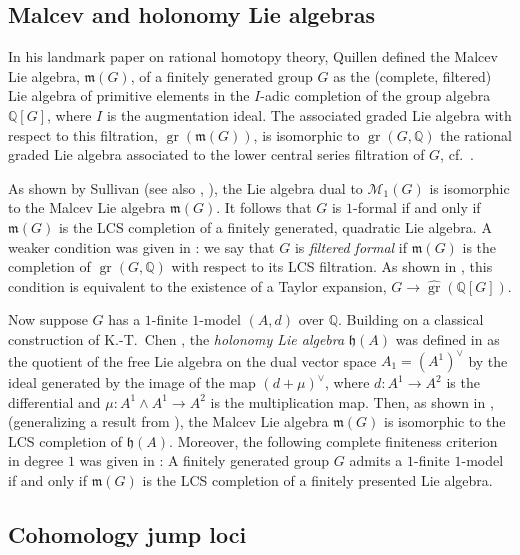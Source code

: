 \documentclass{article}
\numberwithin{equation}{section}
\theoremstyle{definition}
\newcommand{\Q}{\mathbb{Q}}
\newcommand{\M}{\mathcal{M}}
\newcommand{\h}{{\mathfrak{h}}}
\newcommand{\m}{{\mathfrak{m}}}
\DeclareMathOperator{\gr}{gr}
\begin{document}
\subsection{Malcev and holonomy Lie algebras}
\label{subsec:intro-malcev}
In his landmark paper on rational homotopy theory, Quillen \cite{Qu69} 
defined the Malcev Lie algebra, $\m(G)$, of a finitely generated group $G$ 
as the (complete, filtered) Lie algebra of primitive elements in the $I$-adic 
completion of the group algebra $\Q[G]$, where $I$ is the augmentation ideal.  
The associated graded Lie algebra with respect to this filtration, $\gr(\m(G))$, 
is isomorphic to $\gr(G,\Q)$ the rational graded Lie algebra associated 
to the lower central series filtration of $G$, cf.~\cite{Qu68}. 

As shown by Sullivan \cite{Sullivan77} (see also \cite{CP}, \cite{GM13}), 
the Lie algebra dual to $\M_1(G)$ is isomorphic to the Malcev Lie 
algebra $\m(G)$. It follows that $G$ is $1$-formal if and only if 
$\m(G)$ is the LCS completion of a finitely generated, quadratic 
Lie algebra. A weaker condition was given in \cite{SW-forum}: 
we say that $G$ is {\em filtered formal}\/ 
if $\m(G)$ is the completion of $\gr(G,\Q)$ with respect to its 
LCS filtration. As shown in \cite{SW-ejm}, this condition is 
equivalent to the existence of a Taylor expansion, 
$G\to \widehat{\gr}(\Q[G])$.

Now suppose $G$ has a $1$-finite $1$-model $(A,d)$ over $\Q$. 
Building on a classical construction of K.-T.~Chen \cite{Chen73}, 
the {\em holonomy Lie algebra}\/ $\h(A)$ was defined in \cite{MPPS} 
as the quotient of the 
free Lie algebra on the dual vector space $A_1=(A^1)^{\vee}$ 
by the ideal generated by the image of the map $(d+ \mu)^{\vee}$, 
where $d\colon A^1\to A^2$ is the differential and $\mu\colon 
A^1\wedge A^1\to A^2$ is the multiplication map. Then, as shown 
in  \cite{BMPP}, \cite{PS-jlms} (generalizing a result from \cite{Bez}), 
the Malcev Lie algebra $\m(G)$ is isomorphic to the LCS 
completion of $\h(A)$.  Moreover, the following complete 
finiteness criterion in degree $1$ was given in \cite{PS-jlms}: 
A  finitely generated group $G$ admits a $1$-finite $1$-model if 
and only if $\m(G)$ is the LCS completion of a finitely presented 
Lie algebra.

\subsection{Cohomology jump loci}
\label{subsec:intro-cvs}
\end{document}
